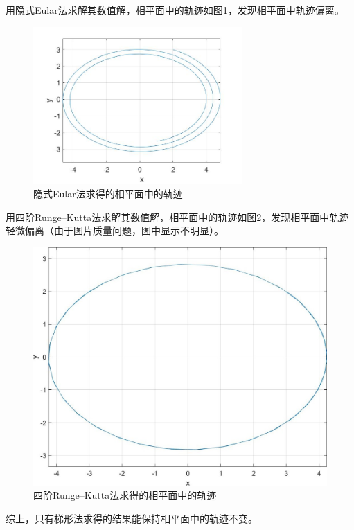\documentclass[10pt,a4paper]{article}
\begin{document}
用隐式Eular法求解其数值解，相平面中的轨迹如图\ref{2_3}，发现相平面中轨迹偏离。
\begin{figure}[h]
\centering
\includegraphics[width=8cm]{ImplEular_2.jpg}
\caption{隐式Eular法求得的相平面中的轨迹}\label{2_3}
\end{figure}

用四阶Runge--Kutta法求解其数值解，相平面中的轨迹如图\ref{2_4}，发现相平面中轨迹轻微偏离（由于图片质量问题，图中显示不明显）。
\begin{figure}[h]
\centering
\includegraphics[width=12cm]{Runge_Kutta_2.jpg}
\caption{四阶Runge--Kutta法求得的相平面中的轨迹}\label{2_4}
\end{figure}

综上，只有梯形法求得的结果能保持相平面中的轨迹不变。
\end{document}
